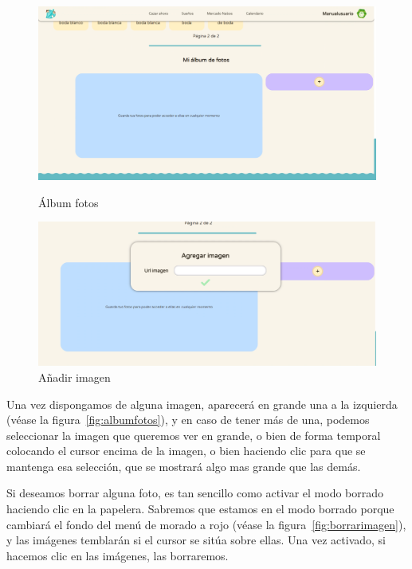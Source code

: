 \begin{figure}[!htb]
	\begin{minipage}{0.48\textwidth}
		\centering
		\includegraphics[width=.8\linewidth]{img/cap9/50-album-fotos.png}
		\caption{Álbum fotos}
		\label{fig:album}
	\end{minipage}\hfill
	\begin{minipage}{0.48\textwidth}
		\centering
		\includegraphics[width=.8\linewidth]{img/cap9/51-anadir-imagen.png}
		\caption{Añadir imagen}
		\label{fig:aniadirimagen}
	\end{minipage}
\end{figure}

Una vez dispongamos de alguna imagen, aparecerá en grande una a la izquierda {(v\'ease la figura~\ref{fig:albumfotos})}, y en caso de tener más de una, podemos seleccionar la imagen que queremos ver en grande, o bien de forma temporal colocando el cursor encima de la imagen, o bien haciendo clic para que se mantenga esa selección, que se mostrará algo mas grande que las demás.\\


Si deseamos borrar alguna foto, es tan sencillo como activar el modo borrado haciendo clic en la papelera. Sabremos que estamos en el modo borrado porque cambiará el fondo del menú de morado a rojo {(v\'ease la figura~\ref{fig:borrarimagen})}, y las imágenes temblarán si el cursor se sitúa sobre ellas. Una vez activado, si hacemos clic en las imágenes, las borraremos.\\

